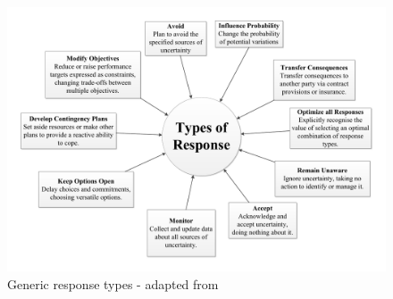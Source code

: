 \begin{figure}[!h]
  \centering
    \includegraphics[width = \textwidth]{./Figures/ResponseTypes.pdf} 
\caption{Generic response types - adapted from \cite{chapman}}
\label{Figure:ResponseTypes}
\end{figure}









